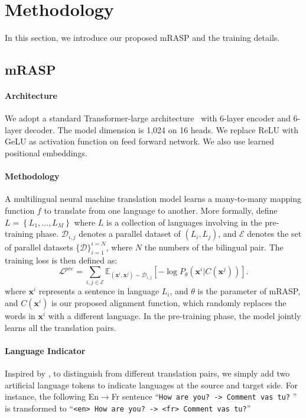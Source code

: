 \documentclass[11pt,a4paper]{article}
\newcommand{\method}{mRASP\xspace}
\newcommand{\mml}{L}
\newcommand{\ml}{\mathcal{L}}
\newcommand{\mmd}{\mathcal{D}}
\newcommand{\mme}{\mathcal{E}}
\newcommand{\xx}{\mathbf{x}}
\begin{document}
\section{Methodology}
\label{sec:approach}

In this section, we introduce our proposed \method and the training details.




\subsection{\method}

\paragraph{Architecture}
We adopt a standard Transformer-large architecture~\cite{DBLP:conf/nips/VaswaniSPUJGKP17} with 6-layer encoder and 6-layer decoder. 
The model dimension is 1,024 on 16 heads. 
We replace ReLU with GeLU \cite{DBLP:journals/corr/HendrycksG16} as activation function on feed forward network. 
We also use learned positional embeddings.

\paragraph{Methodology}
A multilingual neural machine translation model learns a many-to-many mapping function $f$ to translate from one language to another. More formally, define  $\mml=\left\{\mml_{1}, \ldots, \mml_{M}\right\}$ where $\mml$ is a collection of languages involving in the pre-training phase. 
$\mmd_{i,j}$ denotes a parallel dataset of $(\mml_{i}, \mml_j)$, and $\mme$ denotes the set of parallel datasets $\{\mmd\}_{i=1}^{i=N}$, where $N$ the numbers of the bilingual pair. The training loss is then defined as:
\begin{equation}
    \ml^{pre} = \sum_{i,j \in \mme} \mathbb{E}_{(\xx^i,\xx^j)\sim \mmd_{i,j}} [-\log P_\theta(\xx^i|C(\xx^j))].
\label{eq:multi}
\end{equation}
where $\xx^i$ represents a sentence in language $\mml_i$, and $\theta$ is the parameter of \method, and $C(\xx^i)$ is our proposed alignment function, which randomly replaces the words in $\xx^i$ with a different language. 
In the pre-training phase, the model jointly learns all the translation pairs.


\paragraph{Language Indicator}
Inspired by \cite{DBLP:journals/tacl/JohnsonSLKWCTVW17, ha2016toward},  to distinguish from different translation pairs, we simply add two artificial language tokens to indicate languages at the source and target side. For instance, the following En$\rightarrow$Fr sentence  
``\texttt{How are you? -> Comment vas tu?} ''
is transformed to 
``\texttt{<en>  How are you? -> <fr> Comment vas tu?}''
\end{document}
